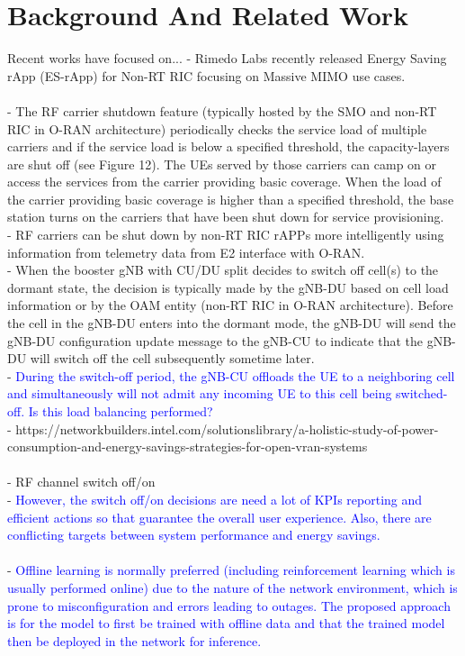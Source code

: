 \documentclass[conference]{IEEEtran}
\begin{document}
\section{Background And Related Work}

Recent works have focused on...
- Rimedo Labs recently released Energy Saving rApp (ES-rApp) for Non-RT RIC focusing on Massive MIMO use cases. \\ 
\\
- The RF carrier shutdown feature (typically hosted by the SMO and non-RT RIC in O-RAN architecture)
periodically checks the service load of multiple carriers and if the service load is below a specified threshold, the capacity-layers are shut off (see Figure 12). The UEs served by those carriers can camp on or access the services from the carrier providing basic coverage. When the load of the carrier providing basic coverage is higher than a specified threshold, the base station turns on the carriers that have been shut down for service provisioning. \\
- RF carriers can be shut down by non-RT RIC rAPPs more intelligently using information from telemetry data from E2 interface with O-RAN.\\
- When the booster gNB with CU/DU split decides to switch off cell(s) to the dormant state, the decision is typically made by the gNB-DU based on cell load information or by the OAM entity (non-RT RIC in O-RAN architecture). Before the cell in the gNB-DU enters into the dormant mode, the gNB-DU will send the gNB-DU configuration update message to the gNB-CU to indicate that the gNB-DU will switch off the cell subsequently sometime later. \\ 
- \textcolor{blue}{During the switch-off period, the gNB-CU offloads the UE to a neighboring cell and simultaneously will not admit any incoming UE to this cell being switched-off. Is this load balancing performed?}\\
- https://networkbuilders.intel.com/solutionslibrary/a-holistic-study-of-power-consumption-and-energy-savings-strategies-for-open-vran-systems \\ 
\\
- RF channel switch off/on \\
- \textcolor{blue}{However, the switch off/on decisions are need a lot of KPIs reporting and efficient actions so that guarantee the overall user experience. Also, there are conflicting targets between system performance and energy savings.} \\
\\
- \textcolor{blue}{Offline learning is normally preferred (including reinforcement learning which is usually performed online) due to the nature of the network environment, which is prone to misconfiguration and errors leading to outages. The proposed approach is for the model to first be trained with offline data and that the trained model then be deployed in the network for inference.} 
\end{document}
